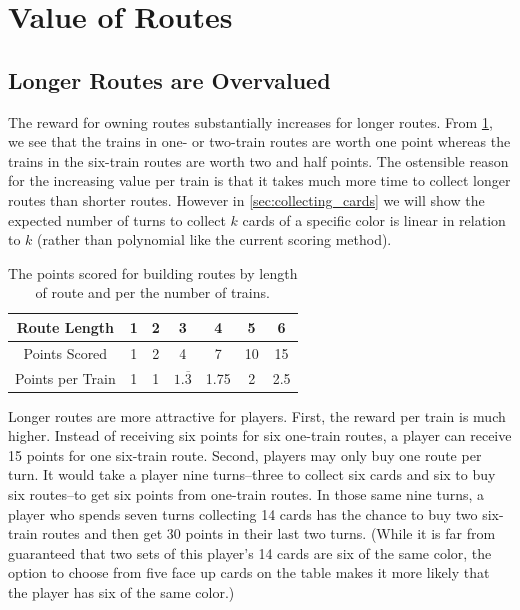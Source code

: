 \newpage
\section{Value of Routes}
\subsection{Longer Routes are Overvalued}
The reward for owning routes substantially increases for longer routes.
From \cref{table:current_value},
we see that the trains in one- or two-train routes are worth one point
whereas the trains in the six-train routes are worth two and half points.
The ostensible reason for the increasing value per train is that
it takes much more time to collect longer routes than shorter routes.
However in \cref{sec:collecting_cards} we will show the expected 
number of turns to collect $k$ cards of a specific
color is linear in relation to $k$
(rather than polynomial like the current scoring method).

\begin{table}[H]
\renewcommand{\arraystretch}{1.5}
\centering
\begin{tabular}{| c | c | c | c | c | c | c |}
\hline
 Route Length & 1 & 2 & 3 & 4 & 5 & 6\\
 \hline
 Points Scored & 1 & 2 & 4 & 7 & 10 & 15\\
 \hline
 Points per Train & 1 & 1 & $1.\overline{3}$ & 1.75 & 2 & 2.5\\
 \hline
\end{tabular}
\caption{The points scored for building routes by length of route
and per the number of trains.}
\label{table:current_value}
\end{table}

Longer routes are more attractive for players.
First, the reward per train is much higher.
Instead of receiving six points for six one-train routes,
a player can receive 15 points for one six-train route.
Second, players may only buy one route per turn.
It would take a player nine turns--three to collect six cards 
and six to buy six routes--to get six points from one-train routes.
In those same nine turns, a player who spends seven turns collecting
14 cards has the chance to buy two six-train routes
and then get 30 points in their last two turns.
(While it is far from guaranteed that two sets of this player's 14 cards are
six of the same color, the option to choose from five face up cards
on the table makes it more likely that the player has six of the same color.)

